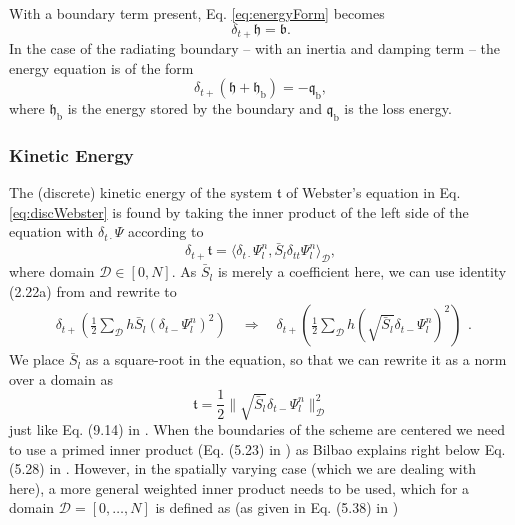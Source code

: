 \documentclass[dvipsnames]{article}
\def\Psiln{\Psi_l^n}
\def\Sbar{\bar S_l}
\def\dtd{\delta_{t\cdot}}
\begin{document}
With a boundary term present, Eq. \eqref{eq:energyForm} becomes
\begin{equation}\label{eq:energyFormBoundary}
    \delta_{t+}\mathfrak{h} = \mathfrak{b}.
\end{equation}
In the case of the radiating boundary -- with an inertia and damping term -- the energy equation is of the form
\begin{equation}\label{eq:radiatingEnergyForm}
    \delta_{t+}(\mathfrak{h}+\mathfrak{h}_\text{b}) = -\mathfrak{q}_\text{b},
\end{equation}
where $\mathfrak{h}_\text{b}$ is the energy stored by the boundary and $\mathfrak{q}_\text{b}$ is the loss energy.
\subsubsection{Kinetic Energy}
The (discrete) kinetic energy of the system $\mathfrak{t}$ of Webster's equation in Eq. \eqref{eq:discWebster} is found by taking the inner product of the left side of the equation with $\dtd\Psi$ according to
\begin{equation}
    \delta_{t+}\mathfrak{t} = \langle\dtd\Psiln,\Sbar \delta_{tt}\Psiln  \rangle_\mathcal{D},
\end{equation}
where domain $\mathcal{D}\in [0, N]$. As $\Sbar$ is merely a coefficient here, we can use identity (2.22a) from \cite{Bilbao2009} and rewrite to
\begin{equation}
    \begin{aligned}
    \delta_{t+}\left(\frac{1}{2}\sum_\mathcal{D}h\Sbar(\delta_{t-}\Psiln)^2\right)\quad \Rightarrow \quad \delta_{t+}\left(\frac{1}{2}\sum_\mathcal{D}h(\sqrt{\Sbar}\delta_{t-}\Psiln)^2\right)
    \end{aligned}.
\end{equation}
We place $\Sbar$ as a square-root in the equation, so that we can rewrite it as a norm over a domain as
\begin{equation}
    \mathfrak{t} = \frac{1}{2}\lVert\sqrt{\bar S_l}\delta_{t-}\Psiln\rVert_\mathcal{D}^2
\end{equation}
just like Eq. (9.14) in \cite{Bilbao2009}. When the boundaries of the scheme are centered we need to use a primed inner product (Eq. (5.23) in \cite{Bilbao2009}) as Bilbao explains right below Eq. (5.28) in \cite{Bilbao2009}. However, in the spatially varying case (which we are dealing with here), a more general weighted inner product needs to be used, which for a domain $\mathcal{D} = [0,\hdots,N]$ is defined as (as given in Eq. (5.38) in \cite{Bilbao2009}) 
\end{document}
